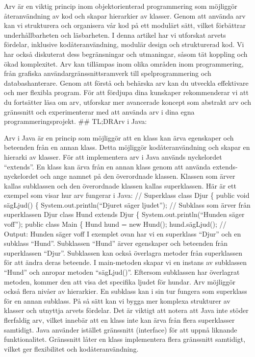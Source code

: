 Arv är en viktig princip inom objektorienterad programmering som
möjliggör återanvändning av kod och skapar hierarkier av klasser. Genom
att använda arv kan vi strukturera och organisera vår kod på ett
modulärt sätt, vilket förbättrar underhållbarheten och läsbarheten. I
denna artikel har vi utforskat arvets fördelar, inklusive
kodåteranvändning, modulär design och strukturerad kod. Vi har också
diskuterat dess begränsningar och utmaningar, såsom tät koppling och
ökad komplexitet. Arv kan tillämpas inom olika områden inom
programmering, från grafiska användargränssnittsramverk till
spelprogrammering och databashanterare. Genom att förstå och behärska
arv kan du utveckla effektivare och mer flexibla program. För att
fördjupa dina kunskaper rekommenderar vi att du fortsätter läsa om arv,
utforskar mer avancerade koncept som abstrakt arv och gränssnitt och
experimenterar med att använda arv i dina egna programmeringsprojekt.
\#\# TL;DRArv i Java:

Arv i Java är en princip som möjliggör att en klass kan ärva egenskaper
och beteenden från en annan klass. Detta möjliggör kodåteranvändning och
skapar en hierarki av klasser. För att implementera arv i Java används
nyckelordet ``extends''. En klass kan ärva från en annan klass genom att
använda extends-nyckelordet och ange namnet på den överordnade klassen.
Klassen som ärver kallas subklassen och den överordnade klassen kallas
superklassen. Här är ett exempel som visar hur arv fungerar i Java: //
Superklass class Djur \{ public void sägLjud() \{
System.out.println(``Djuret säger ljudet''); // Subklass som ärver från
superklassen Djur class Hund extends Djur \{ System.out.println(``Hunden
säger voff''); public class Main \{ Hund hund = new Hund();
hund.sägLjud(); // Output: Hunden säger voff I exemplet ovan har vi en
superklass ``Djur'' och en subklass ``Hund''. Subklassen ``Hund'' ärver
egenskaper och beteenden från superklassen ``Djur''. Subklassen kan
också överlagra metoder från superklassen för att ändra deras beteende.
I main-metoden skapar vi en instans av subklassen ``Hund'' och anropar
metoden ``sägLjud()''. Eftersom subklassen har överlagrat metoden,
kommer den att visa det specifika ljudet för hundar. Arv möjliggör också
flera nivåer av hierarkier. En subklass kan i sin tur fungera som
superklass för en annan subklass. På så sätt kan vi bygga mer komplexa
strukturer av klasser och utnyttja arvets fördelar. Det är viktigt att
notera att Java inte stöder flerfaldig arv, vilket innebär att en klass
inte kan ärva från flera superklasser samtidigt. Java använder istället
gränssnitt (interface) för att uppnå liknande funktionalitet. Gränssnitt
låter en klass implementera flera gränssnitt samtidigt, vilket ger
flexibilitet och kodåteranvändning.


